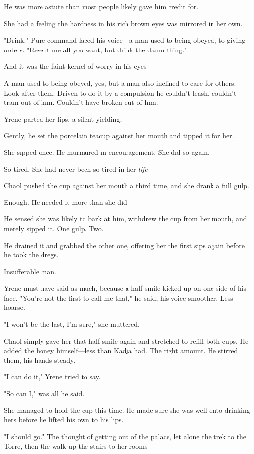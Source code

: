 He was more astute than most people likely gave him credit for.

She had a feeling the hardness in his rich brown eyes was mirrored in her own.

"Drink."
Pure command laced his voice---a man used to being obeyed, to giving orders.
"Resent me all you want, but drink the damn thing."

And it was the faint kernel of worry in his eyes 

A man used to being obeyed, yes, but a man also inclined to care for others.
Look after them.
Driven to do it by a compulsion he couldn't leash, couldn't train out of him.
Couldn't have broken out of him.

Yrene parted her lips, a silent yielding.

Gently, he set the porcelain teacup against her mouth and tipped it for her.

She sipped once.
He murmured in encouragement.
She did so again.

So tired.
She had never been so tired in her \emph{life}---

Chaol pushed the cup against her mouth a third time, and she drank a full gulp.

Enough.
He needed it more than she did---

He sensed she was likely to bark at him, withdrew the cup from her mouth, and merely sipped it.
One gulp.
Two.

He drained it and grabbed the other one, offering her the first sips again before he took the dregs.

Insufferable man.

Yrene must have said as much, because a half smile kicked up on one side of his face.
"You're not the first to call me that," he said, his voice smoother.
Less hoarse.

"I won't be the last, I'm sure," she muttered.

Chaol simply gave her that half smile again and stretched to refill both cups.
He added the honey himself---less than Kadja had.
The right amount.
He stirred them, his hands steady.

"I can do it," Yrene tried to say.

"So can I," was all he said.

She managed to hold the cup this time.
He made sure she was well onto drinking hers before he lifted his own to his lips.

"I should go."
The thought of getting out of the palace, let alone the trek to the Torre, then the walk up the stairs to her rooms 

